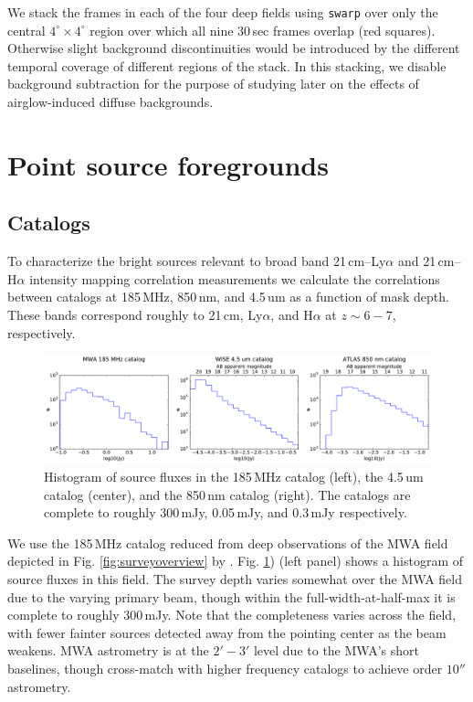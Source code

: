 \documentclass{emulateapj}
\begin{document}
We stack the frames in each of the four deep fields using {\tt swarp} over only the central $4^\circ\times 4^\circ$ region over which all nine 30\,sec frames overlap (red squares). Otherwise slight background discontinuities would be introduced by the different temporal coverage of different regions of the stack. In this stacking, we disable background subtraction for the purpose of studying later on the effects of airglow-induced diffuse backgrounds.

\section{Point source foregrounds}

\subsection{Catalogs}
\label{sec:catalogs}

To characterize the bright sources relevant to broad band  21\,cm--Ly$\alpha$ and  21\,cm--H$\alpha$ intensity mapping correlation measurements we calculate the correlations between catalogs at 185\,MHz, 850\,nm, and 4.5\,um as a function of mask depth. These bands correspond roughly to 21\,cm, Ly$\alpha$, and H$\alpha$ at $z\sim6-7$, respectively. 

\begin{figure}[t]
\centering
\includegraphics[width=6.5in]{images/catalog_histograms.pdf}
\caption{Histogram of source fluxes in the 185\,MHz catalog (left), the 4.5\,um catalog (center), and the 850\,nm catalog (right). The catalogs are complete to roughly 300\,mJy, 0.05\,mJy, and 0.3\,mJy respectively.}
\label{fig:cataloghistograms}
\end{figure}

We use the 185\,MHz catalog reduced from deep observations of the MWA field depicted in Fig. \ref{fig:surveyoverview} by \citep{PattiCatalog1}. Fig. \ref{fig:cataloghistograms}) (left panel) shows a histogram of source fluxes in this field. The survey depth varies somewhat over the MWA field due to the varying primary beam, though within the full-width-at-half-max it is complete to roughly 300\,mJy. Note that the completeness varies across the field, with fewer fainter sources detected away from the pointing center as the beam weakens. MWA astrometry is at the $2'-3'$ level due to the MWA's short baselines, though \citep{PattiCatalog1} cross-match with higher frequency catalogs to achieve order $10''$ astrometry. 
\end{document}
